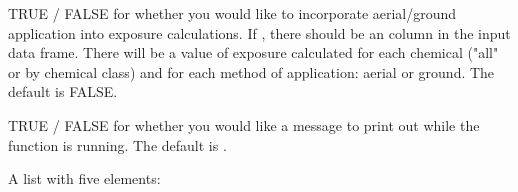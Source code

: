 \documentclass[a4paper]{book}
\begin{document}
\begin{Arguments}
\begin{ldescription}
\item[\code{aerial\_ground}] TRUE / FALSE for whether you would like to
incorporate aerial/ground application into exposure calculations. If
, there should be an 
column in the input  data frame. There will be a value of
exposure calculated for each chemical ("all" or by chemical class) and for
each method of application: aerial or ground. The default is FALSE.

\item[\code{verbose}] TRUE / FALSE for whether you would like a message to print out
while the function is running. The default is .
\end{ldescription}
\end{Arguments}
%
\begin{Value}
A list with five elements:
\begin{description}


\end{description}
\end{Value}
\end{document}
